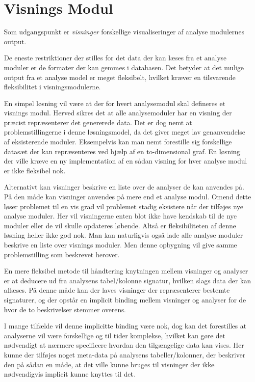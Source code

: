\section{Visnings Modul}

Som udgangspunkt er \textit{visninger} forskellige visualiseringer af analyse modulernes output.

De eneste restriktioner der stilles for det data der kan læses fra et analyse moduler er de formater der kan gemmes i databasen.
Det betyder at det mulige output fra et analyse model er meget fleksibelt, hvilket kræver en tilsvarende fleksibilitet i visningsmodulerne.

En simpel løsning vil være at der for hvert analysemodul skal defineres et visnings modul.
Herved sikres det at alle analysemoduler har en visning der præcist repræsenterer det genererede data.
Det er dog nemt at problemstillingerne i denne løsningsmodel, da det giver meget lav genanvendelse af eksisterende moduler.
Eksempelvis kan man nemt forestille sig forskellige datasæt der kan repræsenteres ved hjælp af en to-dimensional graf.
En løsning der ville kræve en ny implementation af en sådan visning for hver analyse modul er ikke fleksibel nok.

Alternativt kan visninger beskrive en liste over de analyser de kan anvendes på.
På den måde kan visninger anvendes på mere end et analyse modul.
Omend dette løser problemet til en vis grad vil problemet stadig eksistere når der tilføjes nye analyse moduler.
Her vil visningerne enten blot ikke have kendskab til de nye moduler eller de vil skulle opdateres løbende.
Altså er fleksibiliteten af denne løsning heller ikke god nok.
Man kan naturligvis også lade alle analyse moduler beskrive en liste over visnings moduler.
Men denne opbygning vil give samme problemstilling som beskrevet herover.

En mere fleksibel metode til håndtering knytningen mellem visninger og analyser er at deducere ud fra analysens tabel/kolonne signatur, hvilken slags data der kan aflæses.
På denne måde kan der laves visninger der repræsenterer bestemte signaturer, og der opstår en implicit binding mellem visninger og analyser for de hvor de to beskrivelser stemmer overens.

I mange tilfælde vil denne implicitte binding være nok, dog kan det forestilles at analyserne vil være forskellige og til tider komplekse, hvilket kan gøre det nødvendigt at nærmere specificere hvordan den tilgængelige data kan vises.
Her kunne der tilføjes noget meta-data på analysens tabeller/kolonner, der beskriver den på sådan en måde, at det ville kunne bruges til visninger der ikke nødvendigvis implicit kunne knyttes til det.

